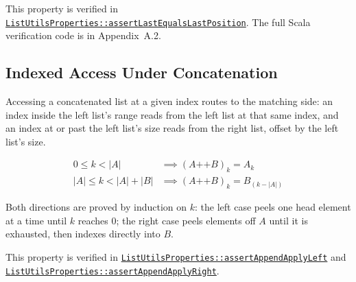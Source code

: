 This property is verified in
\href{https://github.com/thiagomata/prime-numbers/blob/list-article-v1.0.0/src/main/scala/v1/chapter3/list/properties/ListUtilsProperties.scala}{\texttt{ListUtilsProperties::assertLastEqualsLastPosition}}.
The full Scala verification code is in Appendix~A.2.

\subsection{Indexed Access Under Concatenation}

Accessing a concatenated list at a given index routes to the matching
side: an index inside the left list's range reads from the left list at
that same index, and an index at or past the left list's size reads from
the right list, offset by the left list's size.

\begin{equation*}
\begin{aligned}
0 \leq k < |A| &\implies (A \mathbin{\texttt{++}} B)_k = A_k \\
|A| \leq k < |A| + |B| &\implies (A \mathbin{\texttt{++}} B)_k = B_{(k - |A|)}
\end{aligned}
\end{equation*}

Both directions are proved by induction on $k$: the left case peels one
head element at a time until $k$ reaches $0$; the right case peels
elements off $A$ until it is exhausted, then indexes directly into $B$.

{\raggedright
This property is verified in
\href{https://github.com/thiagomata/prime-numbers/blob/list-article-v1.0.0/src/main/scala/v1/chapter3/list/properties/ListUtilsProperties.scala}{\texttt{ListUtilsProperties::\allowbreak assertAppendApplyLeft}}
and
\href{https://github.com/thiagomata/prime-numbers/blob/list-article-v1.0.0/src/main/scala/v1/chapter3/list/properties/ListUtilsProperties.scala}{\texttt{ListUtilsProperties::\allowbreak assertAppendApplyRight}}.
\par}
